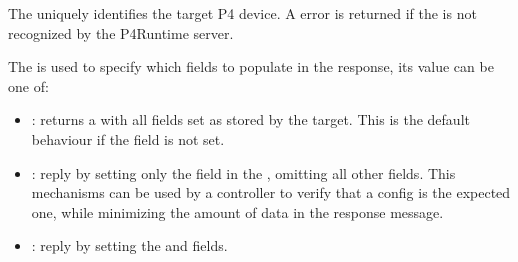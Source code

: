 \documentclass[11pt]{article}
\begin{document}
{%
\noindent{}The  uniquely identifies the target P4 device. A  error is
returned if the  is not recognized by the P4Runtime server.%

The  is used to specify which fields to populate in the response,
its value can be one of:%

\begin{itemize}%

\item{}
: returns a  with all fields
set as stored by the target. This is the default behaviour if the
 field is not set.%

\item{}
: reply by setting only the  field in the
, omitting all other fields. This mechanisms can be
used by a controller to verify that a config is the expected one, while
minimizing the amount of data in the response message.%

\item{}
: reply by setting the  and  fields.%


\end{itemize}}
\end{document}

